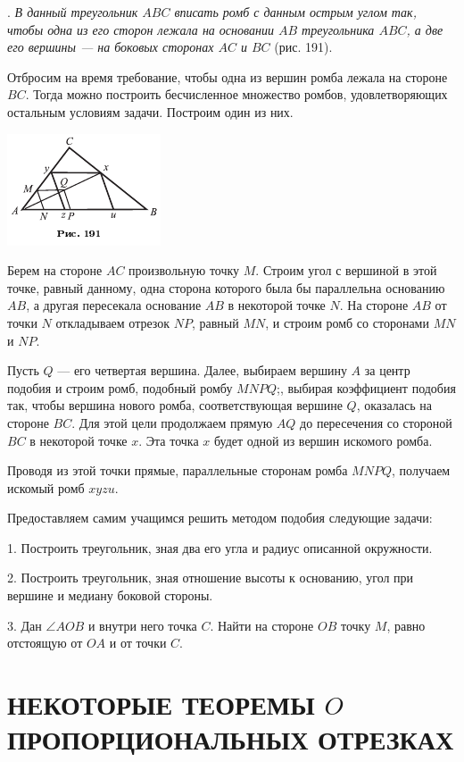 \documentclass[oneside]{book}
\begin{document}
.
\emph{В данный треугольник $ABC$ вписать ромб с данным острым углом так, чтобы одна из его сторон лежала на основании $AB$ треугольника $ABC$, а две его вершины — на боковых сторонах $AC$ и $BC$} (рис. 191).

Отбросим на время требование, чтобы одна из вершин ромба лежала на стороне $BC$.
Тогда можно построить бесчисленное множество ромбов, удовлетворяющих остальным условиям задачи.
Построим один из них.

\includegraphics{pics/ris-191}

Берем на стороне $AC$ произвольную точку $M$.
Строим угол с вершиной в этой точке, равный данному, одна сторона которого была бы параллельна основанию $AB$, а другая пересекала основание $AB$ в некоторой точке $N$.
На стороне $AB$ от точки $N$ откладываем отрезок $NP$, равный $MN$, и строим ромб со сторонами $MN$ и $NP$.

Пусть $Q$ — его четвертая вершина.
Далее, выбираем вершину $A$ за центр подобия и строим ромб, подобный ромбу $MNPQ$;, выбирая коэффициент подобия так, чтобы вершина нового ромба, соответствующая вершине $Q$, оказалась на стороне $BC$.
Для этой цели продолжаем прямую $AQ$ до пересечения со стороной $BC$ в некоторой точке $x$.
Эта точка $x$ будет одной из вершин искомого ромба.

Проводя из этой точки прямые, параллельные сторонам ромба $MNPQ$, получаем искомый ромб $xyzu$.

Предоставляем самим учащимся решить методом подобия следующие задачи:

1.
Построить треугольник, зная два его угла и радиус описанной окружности.

2.
Построить треугольник, зная отношение высоты к основанию, угол при вершине и медиану боковой стороны.

3.
Дан $\angle AOB$ и внутри него точка $C$.
Найти на стороне $OB$ точку $M$, равно отстоящую от $OA$ и от точки $C$.

\section{НЕКОТОРЫЕ ТЕОРЕМЫ $O$ ПРОПОРЦИОНАЛЬНЫХ
ОТРЕЗКАХ}
\end{document}
